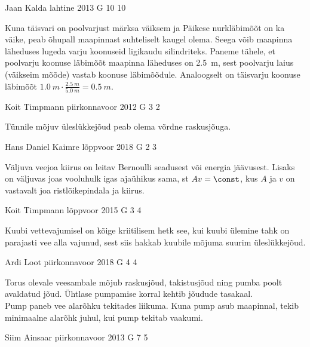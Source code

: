 \documentclass[11pt]{article}
\begin{document}
{%
{Jaan Kalda} %
{lahtine} %
{2013} %
{G 10} %
{10} %
{

\ifHint
Kuna täisvari on poolvarjust märksa väiksem ja Päikese nurkläbimõõt on ka väike, peab õhupall maapinnast suhteliselt kaugel olema. Seega võib maapinna läheduses lugeda varju koonuseid ligikaudu silindriteks. Paneme tähele, et poolvarju koonuse läbimõõt maapinna läheduses on \SI{2,5}{m}, sest poolvarju laius (väikseim mõõde) vastab koonuse läbimõõdule. Analoogselt on täisvarju koonuse läbimõõt $\SI{1,0}{m}\cdot\frac{\SI{2,5}{m}}{\SI{5,0}{m}} = \SI{0,5}{m}$.
\fi
}

{Koit Timpmann} %
{piirkonnavoor} %
{2012} %
{G 3} %
{2} %
{

\ifHint
Tünnile mõjuv üleslükkejõud peab olema võrdne raskusjõuga.
\fi
}

{Hans Daniel Kaimre} %
{lõppvoor} %
{2018} %
{G 2} %
{3} %
{

\ifHint
Väljuva veejoa kiirus on leitav Bernoulli seadusest või energia jäävusest. Lisaks on väljuvas joas vooluhulk igas ajaühikus sama, st $Av = \const$, kus $A$ ja $v$ on vastavalt joa ristlõikepindala ja kiirus.
\fi
}

{Koit Timpmann} %
{lõppvoor} %
{2015} %
{G 3} %
{4} %
{

\ifHint
Kuubi vettevajumisel on kõige kriitilisem hetk see, kui kuubi ülemine tahk on parajasti vee alla vajunud, sest siis hakkab kuubile mõjuma suurim üleslükkejõud.
\fi
}

{Ardi Loot} %
{piirkonnavoor} %
{2018} %
{G 4} %
{4} %
{

\ifHint
\osa Torus olevale veesambale mõjub raskusjõud, takistusjõud ning pumba poolt avaldatud jõud. Ühtlase pumpamise korral kehtib jõudude tasakaal.\\
\osa Pump paneb vee alarõhku tekitades liikuma. Kuna pump asub maapinnal, tekib minimaalne alarõhk juhul, kui pump tekitab vaakumi.
\fi
}

{Siim Ainsaar} %
{piirkonnavoor} %
{2013} %
{G 7} %
{5} %
{

}}
\end{document}

